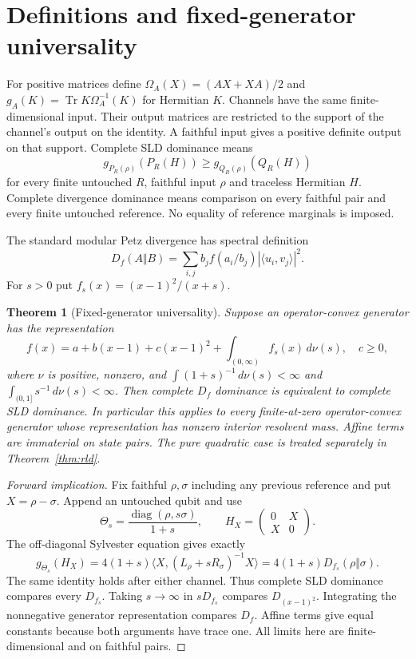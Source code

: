 \documentclass[11pt]{article}
\newtheorem{theorem}{Theorem}
\newcommand{\Tr}{\operatorname{Tr}}
\begin{document}
\section{Definitions and fixed-generator universality}
For positive matrices define $\Omega_A(X)=(AX+XA)/2$ and
$g_A(K)=\Tr K\Omega_A^{-1}(K)$ for Hermitian $K$.
Channels have the same finite-dimensional input. Their output matrices are restricted to the support of the channel's output on the identity. A faithful input gives a positive definite output on that support. Complete SLD dominance means
\[
 g_{P_R(\rho)}(P_R(H))\geq g_{Q_R(\rho)}(Q_R(H))
\]
for every finite untouched $R$, faithful input $\rho$ and traceless Hermitian $H$.
Complete divergence dominance means comparison on every faithful pair and every finite untouched reference. No equality of reference marginals is imposed.

The standard modular Petz divergence has spectral definition
\[
 D_f(A\Vert B)=\sum_{i,j}b_j f(a_i/b_j)|\langle u_i,v_j\rangle|^2.
\]
For $s>0$ put $f_s(x)=(x-1)^2/(x+s)$.

\begin{theorem}[Fixed-generator universality]\label{thm:main}
Suppose an operator-convex generator has the representation
\[
 f(x)=a+b(x-1)+c(x-1)^2+\int_{(0,\infty)}f_s(x)\,d\nu(s),
 \quad c\geq0,
\]
where $\nu$ is positive, nonzero, and
$\int(1+s)^{-1}\,d\nu(s)<\infty$ and $\int_{(0,1]}s^{-1}\,d\nu(s)<\infty$.
Then complete $D_f$ dominance is equivalent to complete SLD dominance.
In particular this applies to every finite-at-zero operator-convex generator whose representation has nonzero interior resolvent mass. Affine terms are immaterial on state pairs. The pure quadratic case is treated separately in Theorem~\ref{thm:rld}.
\end{theorem}

\begin{proof}[Forward implication]
Fix faithful $\rho,\sigma$ including any previous reference and put $X=\rho-\sigma$. Append an untouched qubit and use
\[
 \Theta_s=\frac{\operatorname{diag}(\rho,s\sigma)}{1+s},\qquad
 H_X=\begin{pmatrix}0&X\\X&0\end{pmatrix}.
\]
The off-diagonal Sylvester equation gives exactly
\[
 g_{\Theta_s}(H_X)=4(1+s)\langle X,(L_\rho+sR_\sigma)^{-1}X\rangle
 =4(1+s)D_{f_s}(\rho\Vert\sigma).
\]
The same identity holds after either channel. Thus complete SLD dominance compares every $D_{f_s}$. Taking $s\to\infty$ in $sD_{f_s}$ compares $D_{(x-1)^2}$. Integrating the nonnegative generator representation compares $D_f$. Affine terms give equal constants because both arguments have trace one. All limits here are finite-dimensional and on faithful pairs.
\end{proof}
\end{document}
